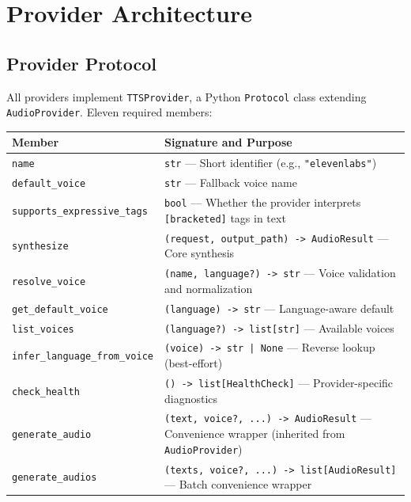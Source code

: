 \documentclass[a4paper,10pt]{article}
\newcommand{\field}[1]{\texttt{#1}}
\begin{document}
\section{Provider Architecture}

\subsection{Provider Protocol}

All providers implement \texttt{TTSProvider}, a Python
\texttt{Protocol} class extending \texttt{AudioProvider}.  Eleven
required members:

\begin{center}
\begin{tabular}{lp{8cm}}
\toprule
\textbf{Member} & \textbf{Signature and Purpose} \\
\midrule
\field{name}           & \texttt{str} --- Short identifier
  (e.g., \texttt{"elevenlabs"}) \\
\field{default\_voice} & \texttt{str} --- Fallback voice name \\
\field{supports\_expressive\_tags} & \texttt{bool} --- Whether the
  provider interprets \texttt{[bracketed]} tags in text \\
\texttt{synthesize}    & \texttt{(request, output\_path) -> AudioResult}
  --- Core synthesis \\
\texttt{resolve\_voice} & \texttt{(name, language?) -> str} --- Voice
  validation and normalization \\
\texttt{get\_default\_voice} & \texttt{(language) -> str} ---
  Language-aware default \\
\texttt{list\_voices}  & \texttt{(language?) -> list[str]} ---
  Available voices \\
\texttt{infer\_language\_from\_voice} & \texttt{(voice) -> str | None}
  --- Reverse lookup (best-effort) \\
\texttt{check\_health} & \texttt{() -> list[HealthCheck]} ---
  Provider-specific diagnostics \\
\texttt{generate\_audio} & \texttt{(text, voice?, ...) -> AudioResult}
  --- Convenience wrapper (inherited from \texttt{AudioProvider}) \\
\texttt{generate\_audios} & \texttt{(texts, voice?, ...) -> list[AudioResult]}
  --- Batch convenience wrapper \\
\bottomrule
\end{tabular}
\end{center}
\end{document}
